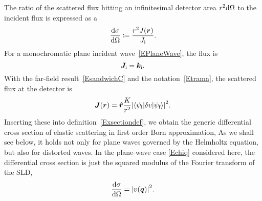 %
The ratio of the scattered flux hitting an infinitesimal detector area
$r^2\mathrm d\Omega$ to the incident flux is expressed as a
%
%
%
\begin{equation}\label{Exsectiondef}
  \frac{\mathrm d\sigma}{\mathrm d\Omega}
  \coloneqq  \frac{r^2 J(\bm{r})}{J_{\text{i}}}.
\end{equation}
%
%
For a monochromatic plane incident wave~\cref{EPlaneWave}, the flux is
%
%
\begin{equation}\label{EJi}
  \bm{J}_{\text{i}} = {\bm{k}}_{\text{i}}.
\end{equation}
With the far-field result~\cref{EsandwichC}
and the notation~\cref{Etrama},
the scattered flux at the detector is
\begin{equation}\label{EJr}
  \bm{J}(\bm{r})
  = \bm{\hat r}\frac{K}{r^2}
    {\left|\braket{\psi_{\text{i}}|\delta v|\psi_{\text{f}}}\right|}^2.
\end{equation}
%
Inserting these into definition~\cref{Exsectiondef},
we obtain the generic differential cross section
of elastic scattering in first order Born approximation,
%
%
%
As we shall see below,
it holds not only for plane waves governed
by the Helmholtz equation,
but also for distorted waves.
%
In the plane-wave case \cref{Echiq} considered here,
the differential cross section is just the squared modulus
of the Fourier transform of the SLD,
%
\begin{equation}\label{Ecross1}
  \frac{\mathrm d\sigma}{\mathrm d\Omega}
  = {\left| v(\bm{q}) \right|}^2.
\end{equation}

